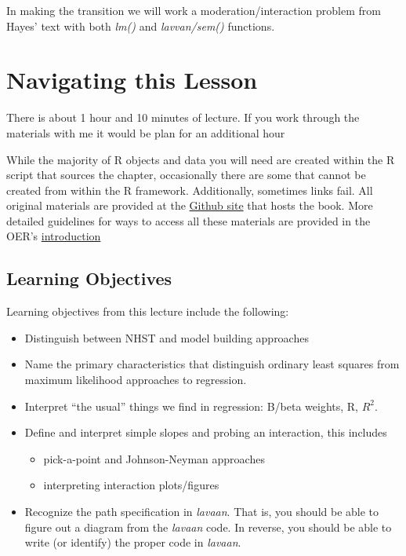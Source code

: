 \documentclass[
]{book}
\providecommand{\tightlist}{%
  \setlength{\itemsep}{0pt}\setlength{\parskip}{0pt}}
\begin{document}
In making the transition we will work a moderation/interaction problem from Hayes' text with both \emph{lm()} and \emph{lavvan/sem()} functions.

\hypertarget{navigating-this-lesson-6}{%
\section{Navigating this Lesson}\label{navigating-this-lesson-6}}

There is about 1 hour and 10 minutes of lecture. If you work through the materials with me it would be plan for an additional hour

While the majority of R objects and data you will need are created within the R script that sources the chapter, occasionally there are some that cannot be created from within the R framework. Additionally, sometimes links fail. All original materials are provided at the \href{https://github.com/lhbikos/ReC_MultivModel}{Github site} that hosts the book. More detailed guidelines for ways to access all these materials are provided in the OER's \protect\hyperlink{ReCintro}{introduction}

\hypertarget{learning-objectives-6}{%
\subsection{Learning Objectives}\label{learning-objectives-6}}

Learning objectives from this lecture include the following:

\begin{itemize}
\tightlist
\item
  Distinguish between NHST and model building approaches
\item
  Name the primary characteristics that distinguish ordinary least squares from maximum likelihood approaches to regression.
\item
  Interpret ``the usual'' things we find in regression: B/beta weights, R, \(R^{2}\).
\item
  Define and interpret simple slopes and probing an interaction, this includes

  \begin{itemize}
  \tightlist
  \item
    pick-a-point and Johnson-Neyman approaches
  \item
    interpreting interaction plots/figures
  \end{itemize}
\item
  Recognize the path specification in \emph{lavaan}. That is, you should be able to figure out a diagram from the \emph{lavaan} code. In reverse, you should be able to write (or identify) the proper code in \emph{lavaan}.
\end{itemize}
\end{document}
